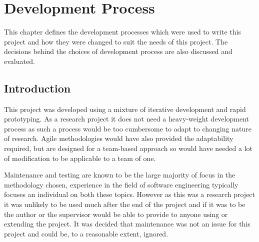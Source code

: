 \chapter{Development Process}




This chapter defines the development processes which were used to write this project and how they
were changed to suit the needs of this project. The decisions behind the choices
of development process are also discussed and evaluated.

\section{Introduction}
This project was developed using a mixture of iterative development and rapid prototyping. As a
research project it does not need a heavy-weight development process as such a process would be
too cumbersome to adapt to changing nature of research. Agile methodologies would have also 
provided the adaptability required, but are designed for a team-based approach so would have
needed a lot of modification to be applicable to a team of one.

Maintenance and testing are known to be the large majority of focus in the methodology chosen,
experience in the field of software engineering typically focuses an individual on both these 
topics. However as this was a research project it was unlikely to be used much after the end of 
the project and if it was to be the author or the supervisor would be able to provide to anyone
using or extending the project. It was decided that maintenance was not an issue for this project
and could be, to a reasonable extent, ignored.


